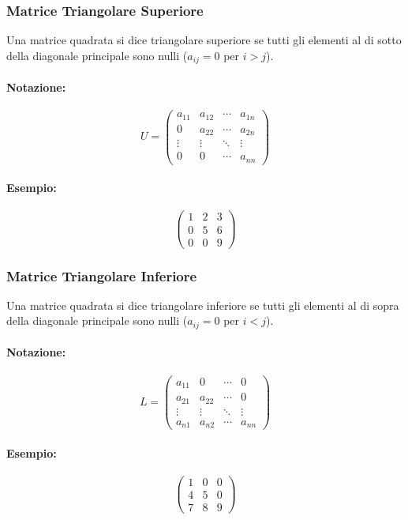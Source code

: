 \documentclass{article}
\begin{document}
\subsubsection*{Matrice Triangolare Superiore}
Una matrice quadrata si dice triangolare superiore se tutti gli elementi al di sotto della diagonale principale sono nulli ($a_{ij} = 0$ per $i>j$).
\paragraph{Notazione:}
\[ U = \begin{pmatrix}
a_{11} & a_{12} & \cdots & a_{1n} \\
0 & a_{22} & \cdots & a_{2n} \\
\vdots & \vdots & \ddots & \vdots \\
0 & 0 & \cdots & a_{nn}
\end{pmatrix} \]
\paragraph{Esempio:}
\[ \begin{pmatrix}
1 & 2 & 3 \\
0 & 5 & 6 \\
0 & 0 & 9
\end{pmatrix} \]

\subsubsection*{Matrice Triangolare Inferiore}
Una matrice quadrata si dice triangolare inferiore se tutti gli elementi al di sopra della diagonale principale sono nulli ($a_{ij} = 0$ per $i<j$).
\paragraph{Notazione:}
\[ L = \begin{pmatrix}
a_{11} & 0 & \cdots & 0 \\
a_{21} & a_{22} & \cdots & 0 \\
\vdots & \vdots & \ddots & \vdots \\
a_{n1} & a_{n2} & \cdots & a_{nn}
\end{pmatrix} \]
\paragraph{Esempio:}
\[ \begin{pmatrix}
1 & 0 & 0 \\
4 & 5 & 0 \\
7 & 8 & 9
\end{pmatrix} \]
\end{document}
